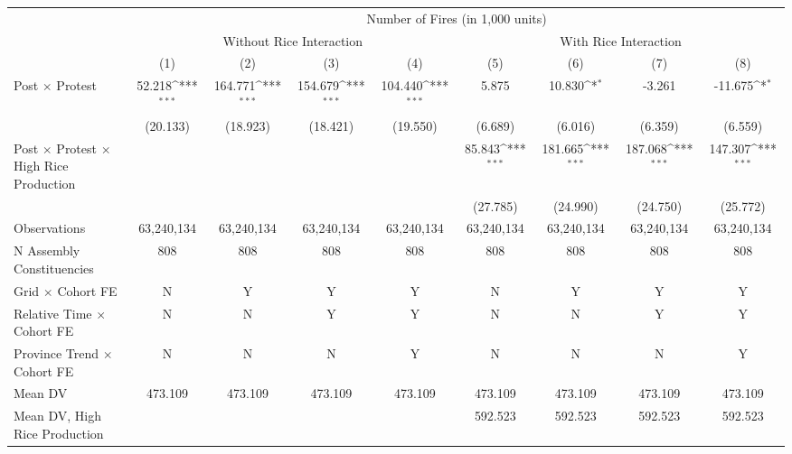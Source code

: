 {\def\sym#1{\ifmmode^{#1}\else\(^{#1}\)\fi}
\begin{tabular}{l*{8}{c}}
\hline
 & \multicolumn{8}{c}{Number of Fires (in 1,000 units)} \\
 & \multicolumn{4}{c}{Without Rice Interaction} & \multicolumn{4}{c}{With Rice Interaction} \\
 & (1) & (2) & (3) & (4) & (5) & (6) & (7) & (8) \\ \hline

Post $\times$ Protest&      52.218\sym{***}&     164.771\sym{***}&     154.679\sym{***}&     104.440\sym{***}&       5.875         &      10.830\sym{*}  &      -3.261         &     -11.675\sym{*}  \\
            &    (20.133)         &    (18.923)         &    (18.421)         &    (19.550)         &     (6.689)         &     (6.016)         &     (6.359)         &     (6.559)         \\
Post $\times$ Protest $\times$ High Rice Production&                     &                     &                     &                     &      85.843\sym{***}&     181.665\sym{***}&     187.068\sym{***}&     147.307\sym{***}\\
            &                     &                     &                     &                     &    (27.785)         &    (24.990)         &    (24.750)         &    (25.772)         \\
\hline
Observations&  63,240,134         &  63,240,134         &  63,240,134         &  63,240,134         &  63,240,134         &  63,240,134         &  63,240,134         &  63,240,134         \\
N Assembly Constituencies&         808         &         808         &         808         &         808         &         808         &         808         &         808         &         808         \\
Grid $\times$ Cohort FE&           N         &           Y         &           Y         &           Y         &           N         &           Y         &           Y         &           Y         \\
Relative Time $\times$ Cohort FE&           N         &           N         &           Y         &           Y         &           N         &           N         &           Y         &           Y         \\
Province Trend $\times$ Cohort FE&           N         &           N         &           N         &           Y         &           N         &           N         &           N         &           Y         \\
Mean DV     &     473.109         &     473.109         &     473.109         &     473.109         &     473.109         &     473.109         &     473.109         &     473.109         \\
Mean DV, High Rice Production&                     &                     &                     &                     &     592.523         &     592.523         &     592.523         &     592.523         \\
\hline
\end{tabular}
}
